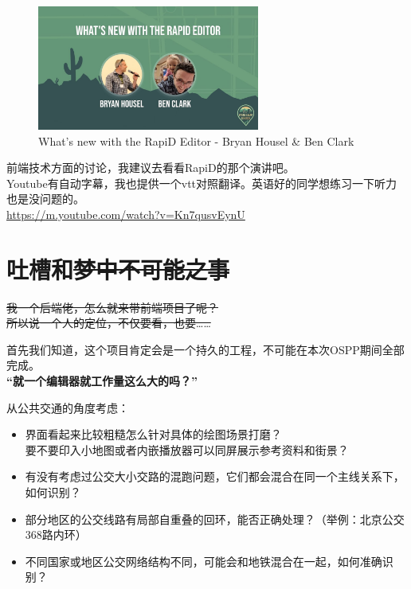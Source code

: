 \documentclass{beamer}
\begin{document}
\begin{frame}
    \begin{figure}[H]
        \centering
        \includegraphics[width=0.65\textwidth]{figure/youtube-Kn7qusvEynU.jpg}
        \caption{What's new with the RapiD Editor - Bryan Housel \& Ben Clark}
    \end{figure}

    \quad \quad 前端技术方面的讨论，我建议去看看RapiD的那个演讲吧。\\
    \quad \quad Youtube有自动字幕，我也提供一个vtt对照翻译。英语好的同学想练习一下听力也是没问题的。 \\
    \quad \quad \url{https://m.youtube.com/watch?v=Kn7qusvEynU}
\end{frame}

\section{吐槽和\sout{梦中不可能之事}}

\begin{frame}
    \Large
    \sout{我一个后端佬，怎么就来带前端项目了呢？}\\
    \sout{所以说一个人的定位，不仅要看，也要……}
\end{frame}

\begin{frame}
    \large
    \quad \quad 首先我们知道，这个项目肯定会是一个持久的工程，不可能在本次OSPP期间全部完成。\\
    \vspace{4em}
    \quad \quad \textbf{“就一个编辑器就工作量这么大的吗？”}
\end{frame}


\begin{frame}
    \Large
    从公共交通的角度考虑：\\
    \normalsize
    \begin{itemize}
        \item 界面看起来比较粗糙怎么针对具体的绘图场景打磨？\\
        要不要印入小地图或者内嵌播放器可以同屏展示参考资料和街景？
        \item  有没有考虑过公交大小交路的混跑问题，它们都会混合在同一个主线关系下，如何识别？
        \item 部分地区的公交线路有局部自重叠的回环，能否正确处理？（举例：北京公交368路内环）
        \item 不同国家或地区公交网络结构不同，可能会和地铁混合在一起，如何准确识别？
    \end{itemize}
    
\end{frame}
\end{document}
